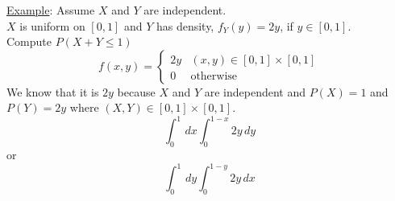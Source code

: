   \underline{Example}: Assume $X$ and $Y$ are independent.\\
  $X$ is uniform on $[0,1]$ and $Y$ has density, $f_Y(y) = 2y$, if 
  $y \in [0,1]$.\\
  Compute $P(X+Y \le 1)$\\
  $$
    f(x,y) = \begin{cases} 2y & (x,y) \in [0,1] \times [0,1]\\
      0 & \text{otherwise} \end{cases}
  $$
  We know that it is $2y$ because $X$ and $Y$ are independent and $P(X) = 1$
  and $P(Y) = 2y$ where $(X,Y) \in [0,1] \times [0,1]$.\\
  $$
    \int_0^1 \,dx \int_0^{1-x} 2y\,dy
  $$
  or
  $$
    \int_0^1 \,dy \int_0^{1-y} 2y\,dx
  $$
